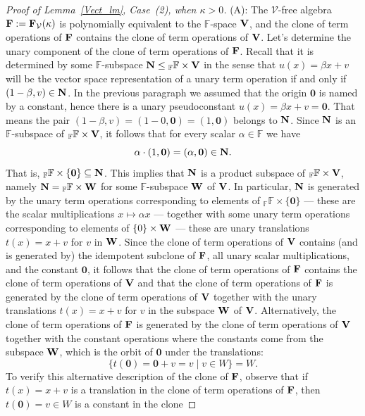 \documentclass[12pt]{amsart}
\theoremstyle{definition}
\numberwithin{equation}{section}
\newcommand{\m}[1]{{\mathbf{\uppercase{#1}}}}
\begin{document}
\begin{proof}[Proof of Lemma~\ref{Vect_lm}, Case~(2), when $\kappa>0$]
(A): The $\mathcal{V}$-free algebra
$\m f := \m f_{\mathcal{V}}(\kappa)$ is polynomially equivalent to
the $\mathbb{F}$-space $\m v$, and the clone
of term operations of $\m f$
contains the clone of term operations of $\m v$.
Let's determine the unary component
of the clone of term operations of $\m f$.
Recall that it is determined by
some $\mathbb{F}$-subspace 
$\m n\leq {}_{\mathbb{F}}\mathbb{F}\times \m v$
in the sense that $u(x) = \beta x+v$
will be the vector space representation
of a unary term operation if and only if
$(1-\beta,v)\in \m n$.
In the previous paragraph we assumed
that the origin $\mathbf{0}$
is named by a constant, hence there is a
unary pseudoconstant $u(x) = \beta x+v = \mathbf{0}$.
That means the pair $(1-\beta,v) =
(1-0,\mathbf{0}) =  (1,\mathbf{0})$
belongs to $\m n$. Since $\m n$ is an $\mathbb{F}$-subspace of 
${}_{\mathbb{F}}\mathbb{F}\times \m v$, it follows
that for every scalar $\alpha\in \mathbb{F}$ we have
\[
\alpha\cdot (1,\mathbf{0}) = (\alpha,\mathbf{0})\in \m n.
\]
That is,
${}_{\mathbb{F}}\mathbb{F}\times \{\mathbf{0}\}\subseteq \m n$.
This implies that $\m n$ is a product subspace
of ${}_{\mathbb{F}}\mathbb{F}\times \m v$,
namely $\m n= {}_{\mathbb{F}}\mathbb{F}\times \m w$ for some
$\mathbb{F}$-subspace $\m w$ of $\m v$.
In particular, $\m n$ is generated by the unary term
operations corresponding to elements of
${}_{\mathbb{F}}\mathbb{F}\times \{\mathbf{0}\}$ ---
these are the scalar multiplications $x\mapsto \alpha x$ ---
together with some unary term
operations corresponding to elements of
$\{0\}\times \m w$ --- these are
unary translations $t(x) = x+v$ for $v$
in $\m w$.
Since the clone of term operations of $\m v$
contains (and is generated by)
the idempotent subclone of $\m f$,
all unary scalar multiplications, and
the constant $\mathbf{0}$, it follows
that the clone of term operations of $\m f$
contains the clone of term operations of $\m v$
and that the clone of term operations of $\m f$
is generated by the clone of term operations of $\m v$
together with the unary translations $t(x) = x+v$ for $v$
in the subspace $\m w$ of $\m v$.
Alternatively, the clone of term operations of $\m f$
is generated by the clone of term operations of $\m v$
together with the constant operations
where the constants come from the subspace
$\m w$, which is the orbit of $\mathbf{0}$ under the translations:
\[\{t(\mathbf{0}) = \mathbf{0} + v = v\;|\;v\in W\} = W.\]
To verify this alternative description of the clone of $\m f$,
observe that if $t(x)=x+v$ is a translation in
the clone of term operations of $\m f$, then
$t(\mathbf{0}) = v\in W$ is a constant in the clone

\end{proof}
\end{document}

